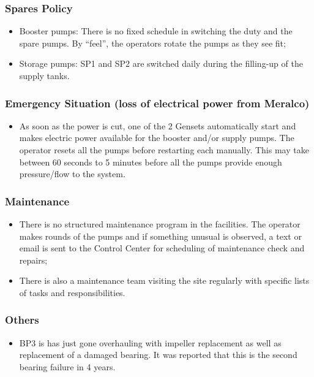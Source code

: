 \subsubsection{Spares Policy}

\begin{itemize}
\item Booster pumps: There is no fixed schedule in switching the duty and the spare pumps. By “feel”, the operators rotate the pumps as they see fit;

\item Storage pumps: SP1 and SP2 are switched daily during the filling-up of the supply tanks.

	
\end{itemize}

\subsubsection{Emergency Situation (loss of electrical power from Meralco)}
\begin{itemize}
	\item As soon as the power is cut, one of the 2 Gensets automatically start and makes electric power available for the booster and/or supply pumps. The operator resets all the pumps before restarting each manually. This may take between 60 seconds to 5 minutes before all the pumps provide enough pressure/flow to the system.
\end{itemize}

\subsubsection{Maintenance}
\begin{itemize}
	\item There is no structured maintenance program in the facilities. The operator makes rounds of the pumps and if something unusual is observed, a text or email is sent to the Control Center for scheduling of maintenance check and repairs;
	
	\item There is also a maintenance team visiting the site regularly with specific lists of tasks and responsibilities. 
	
\end{itemize}

\subsubsection{Others}
\begin{itemize}
	\item BP3 is has just gone overhauling with impeller replacement as well as replacement of a damaged bearing. It was reported that this is the second bearing failure in 4 years.
\end{itemize}

